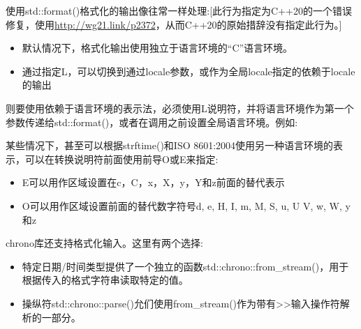 使用std::format()格式化的输出像往常一样处理:[此行为指定为C++20的一个错误修复，使用\url{http://wg21.link/p2372}，从而C++20的原始措辞没有指定此行为。]

\begin{itemize}
\item 
默认情况下，格式化输出使用独立于语言环境的“C”语言环境。

\item 
通过指定L，可以切换到通过locale参数，或作为全局locale指定的依赖于locale的输出
\end{itemize}

则要使用依赖于语言环境的表示法，必须使用L说明符，并将语言环境作为第一个参数传递给std::format()，或者在调用之前设置全局语言环境。例如:


某些情况下，甚至可以根据strftime()和ISO 8601:2004使用另一种语言环境的表示，可以在转换说明符前面使用前导O或E来指定:

\begin{itemize}
\item 
E可以用作区域设置在c，C，x，X，y，Y和z前面的替代表示

\item 
O可以用作区域设置前面的替代数字符号d, e, H, I, m, M, S, u, U V, w, W, y和z
\end{itemize}


chrono库还支持格式化输入。这里有两个选择:

\begin{itemize}
\item 
特定日期/时间类型提供了一个独立的函数std::chrono::from\_stream()，用于根据传入的格式字符串读取特定的值。

\item 
操纵符std::chrono::parse()允们使用from\_stream()作为带有>{}>输入操作符解析的一部分。
\end{itemize}

